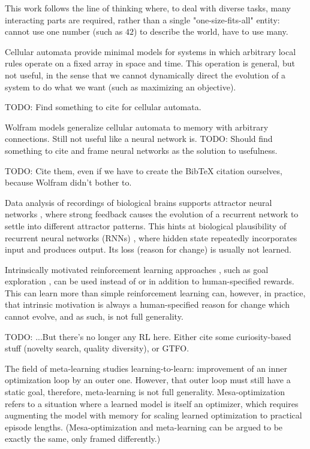 \documentclass{article}
\begin{document}
This work follows the line of thinking \cite{10.5555/22939} \cite{fodor1983modularity} where, to deal with diverse tasks, many interacting parts are required, rather than a single "one-size-fits-all" entity: cannot use one number (such as $42$) to describe the world, have to use many.

Cellular automata provide minimal models for systems in which arbitrary local rules operate on a fixed array in space and time. This operation is general, but not useful, in the sense that we cannot dynamically direct the evolution of a system to do what we want (such as maximizing an objective).

    TODO: Find something to cite for cellular automata.

Wolfram models generalize cellular automata to memory with arbitrary connections. Still not useful like a neural network is. TODO: Should find something to cite and frame neural networks as the solution to usefulness.

    TODO: Cite them, even if we have to create the BibTeX citation ourselves, because Wolfram didn't bother to.

Data analysis of recordings of biological brains supports attractor neural networks \cite{AMIT1990111}, where strong feedback causes the evolution of a recurrent network to settle into different attractor patterns. This hints at biological plausibility of recurrent neural networks (RNNs) \cite{1986Natur.323.533R}, where hidden state repeatedly incorporates input and produces output. Its loss (reason for change) is usually not learned.

Intrinsically motivated reinforcement learning approaches \cite{6294131}, such as goal exploration \cite{DBLP:journals/corr/abs-1708-02190}, can be used instead of or in addition to human-specified rewards. This can learn more than simple reinforcement learning can, however, in practice, that intrinsic motivation is always a human-specified reason for change which cannot evolve, and as such, is not full generality.

    TODO: ...But there's no longer any RL here. Either cite some curiosity-based stuff (novelty search, quality diversity), or GTFO.

The field of meta-learning studies learning-to-learn: improvement of an inner optimization loop by an outer one. However, that outer loop must still have a static goal, therefore, meta-learning is not full generality. Mesa-optimization \cite{hubinger2019risks} refers to a situation where a learned model is itself an optimizer, which requires augmenting the model with memory for scaling learned optimization to practical episode lengths. (Mesa-optimization and meta-learning can be argued to be exactly the same, only framed differently.)
\end{document}
